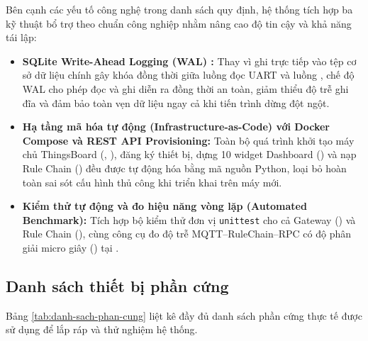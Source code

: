 Bên cạnh các yếu tố công nghệ trong danh sách quy định, hệ thống tích hợp ba kỹ thuật bổ trợ theo chuẩn công nghiệp nhằm nâng cao độ tin cậy và khả năng tái lập:
\begin{itemize}[leftmargin=*, itemsep=3pt]
  \item \textbf{SQLite Write-Ahead Logging (WAL) \cite{ref_sqlite_wal}:} Thay vì ghi trực tiếp vào tệp cơ sở dữ liệu chính gây khóa đồng thời giữa luồng đọc UART và luồng , chế độ WAL cho phép đọc và ghi diễn ra đồng thời an toàn, giảm thiểu độ trễ ghi đĩa và đảm bảo toàn vẹn dữ liệu ngay cả khi tiến trình dừng đột ngột.
  \item \textbf{Hạ tầng mã hóa tự động (Infrastructure-as-Code) với Docker Compose và REST API Provisioning:} Toàn bộ quá trình khởi tạo máy chủ ThingsBoard (, ), đăng ký thiết bị, dựng 10 widget Dashboard () và nạp Rule Chain () đều được tự động hóa bằng mã nguồn Python, loại bỏ hoàn toàn sai sót cấu hình thủ công khi triển khai trên máy mới.
  \item \textbf{Kiểm thử tự động và đo hiệu năng vòng lặp (Automated Benchmark):} Tích hợp bộ kiểm thử đơn vị \texttt{unittest} cho cả Gateway () và Rule Chain (), cùng công cụ đo độ trễ MQTT--RuleChain--RPC có độ phân giải micro giây () tại .
\end{itemize}

\subsection{Danh sách thiết bị phần cứng}
\label{subsec:danh-sach-phan-cung}

Bảng \ref{tab:danh-sach-phan-cung} liệt kê đầy đủ danh sách phần cứng thực tế được sử dụng để lắp ráp và thử nghiệm hệ thống.

